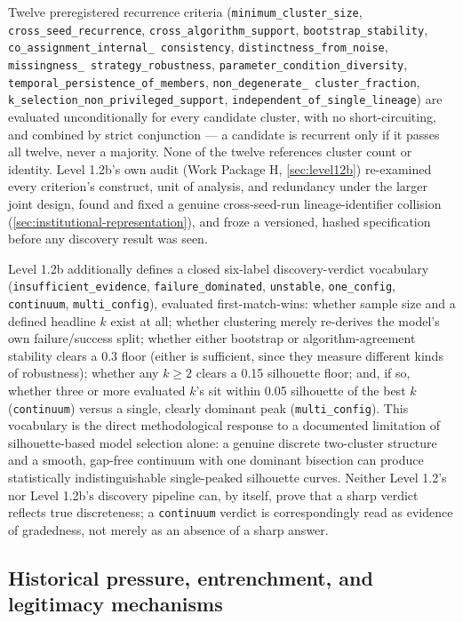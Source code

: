 Twelve preregistered recurrence criteria (\texttt{minimum\_cluster\_size},
\texttt{cross\_seed\_recurrence}, \texttt{cross\_algorithm\_support},
\texttt{bootstrap\_stability}, \texttt{co\_assignment\_internal\_%
consistency}, \texttt{distinctness\_from\_noise}, \texttt{missingness\_%
strategy\_robustness}, \texttt{parameter\_condition\_diversity},
\texttt{temporal\_persistence\_of\_members}, \texttt{non\_degenerate\_%
cluster\_fraction}, \texttt{k\_selection\_non\_privileged\_support},
\texttt{independent\_of\_single\_lineage}) are evaluated unconditionally
for every candidate cluster, with no short-circuiting, and combined by
strict conjunction --- a candidate is recurrent only if it passes all
twelve, never a majority. None of the twelve references cluster count or
identity. Level 1.2b's own audit (Work Package H, \cref{sec:level12b})
re-examined every criterion's construct, unit of analysis, and redundancy
under the larger joint design, found and fixed a genuine cross-seed-run
lineage-identifier collision (\cref{sec:institutional-representation}),
and froze a versioned, hashed specification before any discovery result
was seen.

Level 1.2b additionally defines a closed six-label discovery-verdict
vocabulary (\texttt{insufficient\_evidence}, \texttt{failure\_dominated},
\texttt{unstable}, \texttt{one\_config}, \texttt{continuum},
\texttt{multi\_config}), evaluated first-match-wins: whether sample size
and a defined headline $k$ exist at all; whether clustering merely
re-derives the model's own failure/success split; whether either
bootstrap or algorithm-agreement stability clears a 0.3 floor (either is
sufficient, since they measure different kinds of robustness); whether
any $k\geq2$ clears a 0.15 silhouette floor; and, if so, whether three or
more evaluated $k$'s sit within 0.05 silhouette of the best $k$
(\texttt{continuum}) versus a single, clearly dominant peak
(\texttt{multi\_config}). This vocabulary is the direct methodological
response to a documented limitation of silhouette-based model selection
alone: a genuine discrete two-cluster structure and a smooth, gap-free
continuum with one dominant bisection can produce statistically
indistinguishable single-peaked silhouette curves. Neither Level 1.2's
nor Level 1.2b's discovery pipeline can, by itself, prove that a sharp
verdict reflects true discreteness; a \texttt{continuum} verdict is
correspondingly read as evidence of gradedness, not merely as an absence
of a sharp answer.

\subsection{Historical pressure, entrenchment, and legitimacy mechanisms}
\label{sec:historical-mechanisms}
\label{sec:observer-metrics-l13}

